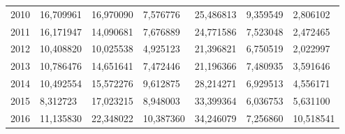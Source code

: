 \begin{table}
\begin{tabular}{p{1cm}p{2cm}p{2cm}p{2cm}p{2cm}p{2cm}p{2cm}}
 2010 &                            16,709961 &       16,970090 &  7,576776 &                           25,486813 &         9,359549 &                                   2,806102 \\
 2011 &                            16,171947 &       14,090681 &  7,676889 &                           24,771586 &         7,523048 &                                   2,472465 \\
 2012 &                            10,408820 &       10,025538 &  4,925123 &                           21,396821 &         6,750519 &                                   2,022997 \\
 2013 &                            10,786476 &       14,651641 &  7,472446 &                           21,196366 &         7,480935 &                                   3,591646 \\
 2014 &                            10,492554 &       15,572276 &  9,612875 &                           28,214271 &         6,929513 &                                   4,556171 \\
 2015 &                             8,312723 &       17,023215 &  8,948003 &                           33,399364 &         6,036753 &                                   5,631100 \\
 2016 &                            11,135830 &       22,348022 & 10,387360 &                           34,246079 &         7,256860 &                                  10,518541 \\
\bottomrule
\end{tabular}
\end{table}
